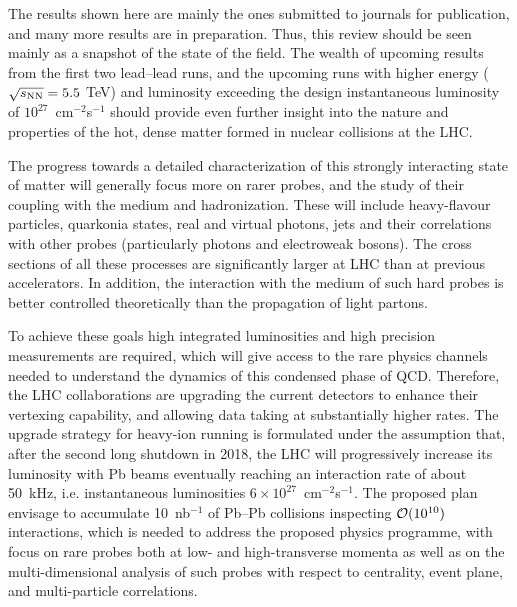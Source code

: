 The results shown here are mainly the ones submitted to journals for publication, and many more
results are in preparation.  Thus, this review should be seen mainly as a snapshot of
the state of the field.  The wealth of upcoming results from the first two lead--lead runs,
and the upcoming runs with higher energy ($\mbox{$\sqrt{s_{\mathrm{NN}}}$} = 5.5$ TeV) and luminosity
exceeding the design instantaneous luminosity of $10^{27}$~cm$^{-2}$s$^{-1}$ should
provide even further insight into
the nature and properties of the hot, dense matter formed in nuclear collisions at the LHC.

The progress towards a detailed characterization of this strongly
interacting state of matter will generally focus more on rarer probes,
and the study of their coupling with the medium and
hadronization. These will include heavy-flavour particles, quarkonia
states, real and virtual photons, jets and their correlations with
other probes (particularly photons and electroweak bosons).  The cross
sections of all these processes are significantly larger at LHC than
at previous accelerators. In addition, the interaction with the medium
of such hard probes is better controlled theoretically than the
propagation of light partons.

To achieve these goals high integrated luminosities and high precision measurements
are required, which will give access to the rare physics channels
needed to understand the dynamics of this condensed phase of QCD.
Therefore, the LHC collaborations are upgrading the current
detectors to enhance their vertexing capability, and allowing data
taking at substantially higher rates.  The upgrade strategy for
heavy-ion running is formulated under the assumption that, after the
second long shutdown in 2018, the LHC will progressively increase its
luminosity with Pb beams eventually reaching an interaction rate of
about 50~kHz, i.e. instantaneous luminosities $6 \times
10^{27}$~cm$^{-2}$s$^{-1}$. The proposed plan~\cite{ALICEUpgradeLoI}
envisage to accumulate 10~nb$^{-1}$ of Pb--Pb collisions inspecting
${\cal O}(10^{10})$ interactions, which is needed to address the
proposed physics programme, with focus on rare probes both at low- and
high-transverse momenta as well as on the multi-dimensional analysis
of such probes with respect to centrality, event plane, and
multi-particle correlations.
